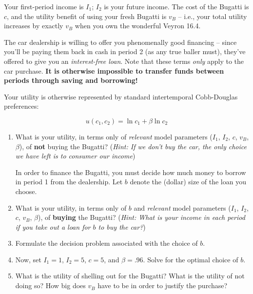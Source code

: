 \documentclass{article}
\begin{document}
Your first-period income is $I_1$; $I_2$ is your future income. The cost of the Bugatti is $c$, and the utility benefit of using your fresh Bugatti is $v_B$ -- i.e., your total utility increases by exactly $v_B$ when you own the wonderful Veyron 16.4.

The car dealership is willing to offer you phenomenally good financing -- since you'll be paying them back in cash in period 2 (as any true baller must), they've offered to give you an \textit{interest-free loan}. Note that these terms \textit{only} apply to the car purchase. \textbf{It is otherwise impossible to transfer funds between periods through saving and borrowing!}

Your utility is otherwise represented by standard intertemporal Cobb-Douglas preferences:

\[ u(c_1, c_2) = \ln c_1 + \beta \ln c_2 \]

\begin{enumerate}
\item What is your utility, in terms only of \textit{relevant} model parameters ($I_1$, $I_2$, $c$, $v_B$, $\beta$), of \textbf{not} buying the Bugatti? (\textit{Hint: If we don't buy the car, the only choice we have left is to consumer our income})

In order to finance the Bugatti, you must decide how much money to borrow in period 1 from the dealership. Let $b$ denote the (dollar) size of the loan you choose.

\item What is your utility, in terms only of $b$ and \textit{relevant} model parameters ($I_1$, $I_2$, $c$, $v_B$, $\beta$), of \textbf{buying} the Bugatti? (\textit{Hint: What is your income in each period if you take out a loan for $b$ to buy the car?})

\item Formulate the decision problem associated with the choice of $b$.

\item Now, set $I_1 = 1$, $I_2 = 5$, $c = 5$, and $\beta = .96$. Solve for the optimal choice of $b$.

\item What is the utility of shelling out for the Bugatti? What is the utility of not doing so? How big does $v_B$ have to be in order to justify the purchase?
\end{enumerate}
\end{document}
